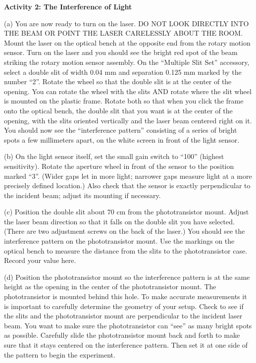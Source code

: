\textbf{Activity 2: The Interference of Light }

(a) You are now ready to turn on the laser. DO NOT LOOK DIRECTLY INTO
THE BEAM OR POINT THE LASER CARELESSLY ABOUT THE ROOM. Mount the laser on the 
optical bench at the opposite end from the rotary motion sensor. Turn on the
laser and you should see the bright red spot of the beam striking
the rotary motion sensor assembly. On the ``Multiple Slit Set'' accessory, 
select a double slit of width 0.04 mm and separation 0.125 mm marked by the number “2”. 
Rotate the 
wheel so that the double slit is at the center of the opening.
You can rotate the wheel with the slits AND rotate where the slit wheel is mounted
on the plastic frame. Rotate both so that when you click the frame onto the optical bench, the double slit that
you want is at the center of the opening, with the slits oriented vertically and the laser beam centered right on
it. You should now see the “interference pattern” consisting of a series of bright spots a few millimeters apart,
on the white screen in front of the light sensor.

(b) On the light sensor itself, set the small gain switch to “100” (highest sensitivity). Rotate the aperture wheel
in front of the sensor to the position marked “3”. (Wider gaps let in more light; narrower gaps measure light
at a more precisely defined location.) Also check that the sensor is exactly perpendicular to the incident beam;
adjust its mounting if necessary.

(c) Position the double slit about 70 cm from the phototransistor mount. Adjust 
the laser beam direction so that it falls on the double slit you have selected. 
(There are two adjustment screws on the back of the laser.) 
You should see the interference pattern on the phototransistor mount. 
Use the markings on the optical bench to measure the distance from the slits
to the phototransistor case.
Record your value here.
\vspace{10mm}

(d) Position the phototransistor mount so the interference pattern
is at the same height as the opening in the center of the phototransistor mount. 
The phototransistor is mounted behind this hole. 
To make accurate measurements it is important to carefully determine the geometry of your setup. 
Check to see if the slits and the phototransistor mount are perpendicular to the incident
laser beam.  You want to make sure the phototransistor can {}``see'' as many
bright spots as possible. Carefully slide the phototransistor mount 
back and forth to make sure that it stays centered on the interference pattern. 
Then set it at one side of the pattern to begin the experiment.

